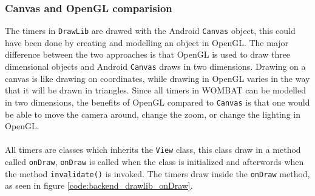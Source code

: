 \subsubsection*{Canvas and OpenGL comparision}
\label{subsection:compare}
The timers in \texttt{DrawLib} are drawed with the Android \texttt{Canvas} object, this could have been done by creating and modelling an object in OpenGL.
The major difference between the two approaches is that OpenGL is used to draw three dimensional objects and Android \texttt{Canvas} draws in two dimensions.
Drawing on a canvas is like drawing on coordinates, while drawing in OpenGL varies in the way that it will be drawn in triangles.
Since all timers in WOMBAT can be modelled in two dimensions, the benefits of OpenGL compared to \texttt{Canvas} is that one would be able to move the camera around, change the zoom, or change the lighting in OpenGL.\\
\\

All timers are classes which inherits the \texttt{View} class, this class draw in a method called \texttt{onDraw}, \texttt{onDraw} is called when the class is initialized and afterwords when the method \texttt{invalidate()} is invoked.
The timers draw inside the \texttt{onDraw} method, as seen in figure \ref{code:backend_drawlib_onDraw}.

